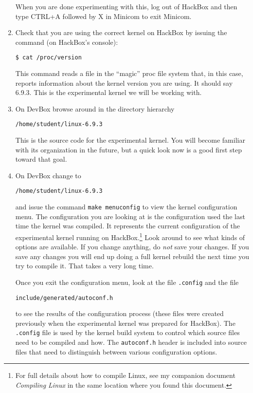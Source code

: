 \documentclass{article}
\newcommand{\command}[1]{\texttt{#1}}
\newcommand{\filename}[1]{\texttt{#1}}
\begin{document}
\begin{enumerate}
  When you are done experimenting with this, log out of HackBox and then type CTRL+A followed by
  X in Minicom to exit Minicom.

\item Check that you are using the correct kernel on HackBox by issuing the command (on
  HackBox's console):
\begin{Verbatim}
$ cat /proc/version
\end{Verbatim}
  This command reads a file in the ``magic'' proc file system that, in this case, reports
  information about the kernel version you are using. It should say 6.9.3. This is the
  experimental kernel we will be working with.

\item On DevBox browse around in the directory hierarchy
\begin{Verbatim}
/home/student/linux-6.9.3
\end{Verbatim}
  This is the source code for the experimental kernel. You will become familiar with its
  organization in the future, but a quick look now is a good first step toward that goal.

\item On DevBox change to
\begin{Verbatim}
/home/student/linux-6.9.3
\end{Verbatim}
  and issue the command \command{make menuconfig} to view the kernel configuration menu. The
  configuration you are looking at is the configuration used the last time the kernel was
  compiled. It represents the current configuration of the experimental kernel running on
  HackBox.\footnote{For full details about how to compile Linux, see my companion document
  \textit{Compiling Linux} in the same location where you found this document.} Look around to
  see what kinds of options are available. If you change anything, do \emph{not} save your
  changes. If you save any changes you will end up doing a full kernel rebuild the next time you
  try to compile it. That takes a very long time.

  Once you exit the configuration menu, look at the file \filename{.config} and the file
\begin{Verbatim}
include/generated/autoconf.h
\end{Verbatim}
  to see the results of the configuration process (these files were created previously when the
  experimental kernel was prepared for HackBox). The \filename{.config} file is used by the kernel
  build system to control which source files need to be compiled and how. The
  \filename{autoconf.h} header is included into source files that need to distinguish between
  various configuration options.
\end{enumerate}
\end{document}
